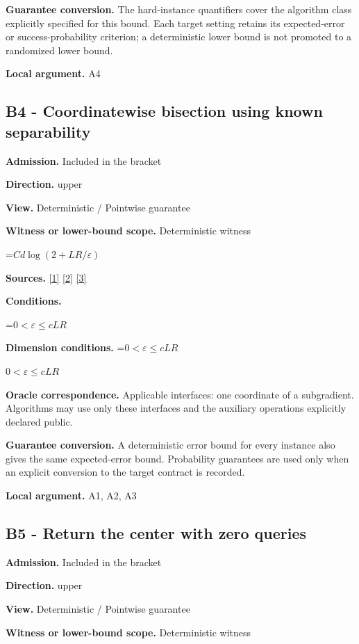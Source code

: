 \documentclass[10pt,a4paper]{article}
\newcommand{\AtlasMath}[1]{\par\begingroup\centering\setbox0=\hbox{$\displaystyle #1$}\ifdim\wd0>1.4\linewidth\typeout{ATLAS WIDE FORMULA: \the\wd0}\fi\ifdim\wd0>\linewidth\resizebox{\linewidth}{!}{\box0}\else\box0\fi\par\endgroup}
\newcommand{\AtlasInlineMath}[1]{\begingroup\setbox0=\hbox{$#1$}\ifdim\wd0>.4\linewidth\endgroup\AtlasMath{#1}\else\endgroup$#1$\fi}
\begin{document}
\textbf{Guarantee conversion.} The hard-instance quantifiers cover the algorithm class explicitly specified for this bound. Each target setting retains its expected-error or success-probability criterion; a deterministic lower bound is not promoted to a randomized lower bound.

\textbf{Local argument.} A4

\subsection{B4 - Coordinatewise bisection using known separability}
\textbf{Admission.} Included in the bracket

\textbf{Direction.} upper

\textbf{View.} Deterministic / Pointwise guarantee

\textbf{Witness or lower-bound scope.} Deterministic witness

\AtlasMath{Cd\log(2+LR/\varepsilon)}
\textbf{Sources.} \href{https://arxiv.org/pdf/1405.4980}{[1]} \href{https://www2.isye.gatech.edu/~nemirovs/MOR_AccuracyCertificates.pdf}{[2]} \href{https://arxiv.org/pdf/2609.20701}{[3]}

\textbf{Conditions.} 
\AtlasMath{0<\varepsilon\le cLR}


\textbf{Dimension conditions.} \AtlasInlineMath{0<\varepsilon\le cLR}

\textbf{Oracle correspondence.} Applicable interfaces: one coordinate of a subgradient. Algorithms may use only these interfaces and the auxiliary operations explicitly declared public.

\textbf{Guarantee conversion.} A deterministic error bound for every instance also gives the same expected-error bound. Probability guarantees are used only when an explicit conversion to the target contract is recorded.

\textbf{Local argument.} A1, A2, A3

\subsection{B5 - Return the center with zero queries}
\textbf{Admission.} Included in the bracket

\textbf{Direction.} upper

\textbf{View.} Deterministic / Pointwise guarantee

\textbf{Witness or lower-bound scope.} Deterministic witness
\end{document}
